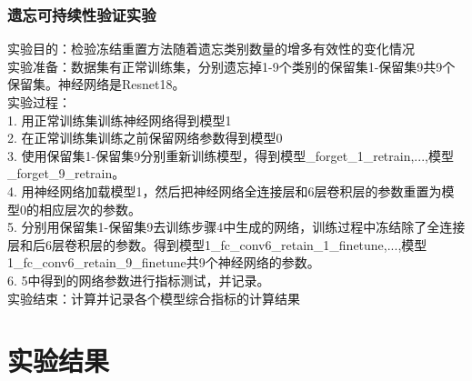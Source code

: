 \subsubsection{遗忘可持续性验证实验}
实验目的：检验冻结重置方法随着遗忘类别数量的增多有效性的变化情况
\\实验准备：数据集有正常训练集，分别遗忘掉1-9个类别的保留集1-保留集9共9个保留集。神经网络是Resnet18。
\\实验过程：
\\1. 用正常训练集训练神经网络得到模型1
\\2. 在正常训练集训练之前保留网络参数得到模型0
\\3. 使用保留集1-保留集9分别重新训练模型，得到模型\_forget\_1\_retrain,...,模型\_forget\_9\_retrain。
\\4. 用神经网络加载模型1，然后把神经网络全连接层和6层卷积层的参数重置为模型0的相应层次的参数。
\\5. 分别用保留集1-保留集9去训练步骤4中生成的网络，训练过程中冻结除了全连接层和后6层卷积层的参数。得到模型1\_fc\_conv6\_retain\_1\_finetune,...,模型1\_fc\_conv6\_retain\_9\_finetune共9个神经网络的参数。
\\6. 5中得到的网络参数进行指标测试，并记录。
\\实验结束：计算并记录各个模型综合指标的计算结果
\section{实验结果}
